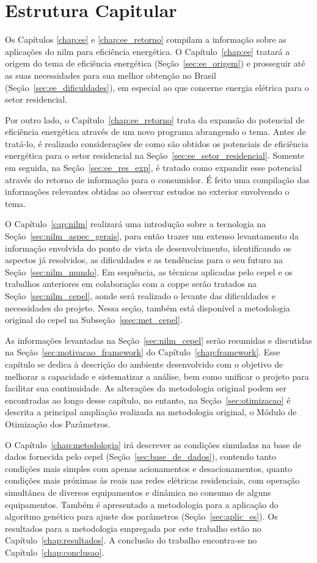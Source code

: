\section{Estrutura Capitular}

Os Capítulos \ref{chap:ee} e \ref{chap:ee_retorno} compilam a
informação sobre as aplicações do \acs{nilm} para eficiência
energética. O Capítulo~\ref{chap:ee} tratará a origem do tema de
eficiência energética (Seção~\ref{sec:ee_origem}) e prosseguir até as
suas necessidades para sua melhor obtenção no Brasil
(Seção~\ref{sec:ee_dificuldades}), em especial ao que concerne
energia elétrica para o setor residencial.

Por outro lado, o Capítulo~\ref{chap:ee_retorno} trata da expansão do
potencial de eficiência energética através de um novo programa
abrangendo o tema. Antes de tratá-lo, é realizado considerações de
como são obtidos os potenciais de eficiência energética para o setor
residencial na Seção~\ref{sec:ee_setor_residencial}. Somente em
seguida, na Seção~\ref{sec:ee_res_exp}, é tratado como expandir esse
potencial através do retorno de informação para o consumidor. É
feito uma compilação das informações relevantes obtidas ao
observar estudos no exterior envolvendo o tema.

O Capítulo~\ref{cap:nilm} realizará uma introdução sobre a tecnologia
na Seção~\ref{sec:nilm_aspec_gerais}, para então trazer um extenso
levantamento da informação envolvida do ponto de vista de
desenvolvimento, identificando os aspectos já resolvidos, as
dificuldades e as tendências para o seu futuro na
Seção~\ref{sec:nilm_mundo}. Em sequência, as técnicas aplicadas pelo
\acs{cepel} e os trabalhos anteriores em colaboração com a \acs{coppe}
serão tratados na Seção~\ref{sec:nilm_cepel}, aonde será realizado o
levante das dificuldades e necessidades do projeto. Nessa seção,
também está disponível a metodologia original do \acs{cepel} na
Subseção~\ref{ssec:met_cepel}.

As informações levantadas na Seção~\ref{sec:nilm_cepel} serão
resumidas e discutidas na Seção~\ref{sec:motivacao_framework} do
Capítulo~\ref{chap:framework}. Esse capítulo se dedica à descrição do
ambiente desenvolvido com o objetivo de melhorar a capacidade e
sistematizar a análise, bem como unificar o projeto para facilitar sua
continuidade. As alterações da metodologia original podem ser
encontradas ao longo desse capítulo, no entanto, na
Seção~\ref{sec:otimizacao} é descrita a principal ampliação realizada
na metodologia original, o Módulo de Otimização dos Parâmetros. 

O Capítulo~\ref{chap:metodologia} irá descrever as condições simuladas
na base de dados fornecida pelo \acs{cepel}
(Seção~\ref{sec:base_de_dados}), contendo tanto condições mais simples
com apenas acionamentos e desacionamentos, quanto condições mais
próximas às reais nas redes elétricas residenciais, com operação
simultânea de diversos equipamentos e dinâmica no consumo de alguns
equipamentos. Também é apresentado a metodologia para a aplicação do
algoritmo genético para ajuste dos parâmetros
(Seção~\ref{sec:aplic_es}). Os resultados para a metodologia empregada
por este trabalho estão no Capítulo~\ref{chap:resultados}. A conclusão
do trabalho encontra-se no Capítulo~\ref{chap:conclusao}.

\glsunsetall
